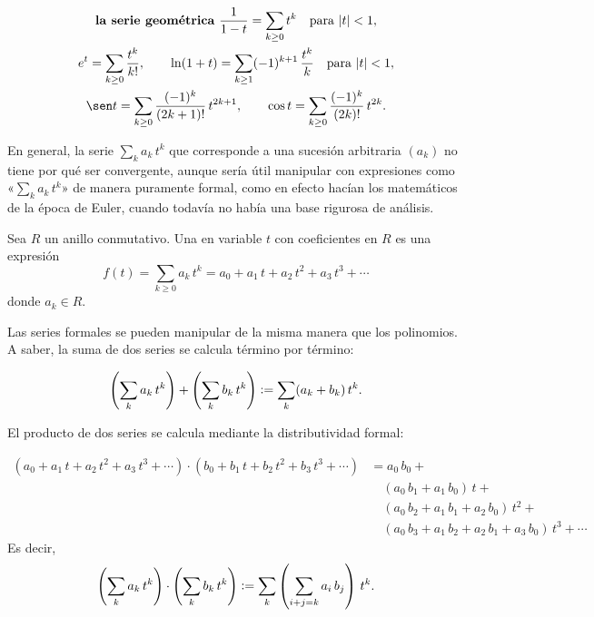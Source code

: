 \documentclass{article}
\numberwithin{equation}{section}
\theoremstyle{definition}
\begin{document}
\begin{gather*}
  \text{\term{la serie geométrica} }\frac{1}{1-t} = \sum_{k \ge 0} t^k\quad\text{para }|t| < 1,\\
  e^t = \sum_{k\ge 0} \frac{t^k}{k!}, \quad\quad
  \ln (1+t) = \sum_{k \ge 1} (-1)^{k+1}\,\frac{t^k}{k}\quad\text{para }|t| < 1,\\
  \sen t = \sum_{k \ge 0} \frac{(-1)^k}{(2k+1)!}\,t^{2k+1}, \quad\quad
  \cos t = \sum_{k \ge 0} \frac{(-1)^k}{(2k)!}\,t^{2k}.
\end{gather*}

En general, la serie $\sum_k a_k\,t^k$ que corresponde a una sucesión arbitraria
$(a_k)$ no tiene por qué ser convergente, aunque sería útil manipular con
expresiones como «$\sum_k a_k\,t^k$» de manera puramente formal, como en
efecto hacían los matemáticos de la época de Euler, cuando todavía no había
una base rigurosa de análisis.

\begin{definicion}
  Sea $R$ un anillo conmutativo. Una  en
  variable $t$ con coeficientes en $R$ es una expresión
  $$f (t) = \sum_{k \ge 0} a_k\,t^k = a_0 + a_1\,t + a_2\,t^2 + a_3\,t^3 + \cdots$$
  donde $a_k \in R$.
\end{definicion}

Las series formales se pueden manipular de la misma manera que los polinomios.
A saber, la suma de dos series se calcula término por término:

\begin{equation}
  \label{adicion-de-series-formales}
  \left(\sum_k a_k\,t^k\right) + \left(\sum_k b_k\,t^k\right) \mathrel{\mathop:}= \sum_k (a_k+b_k)\,t^k.
\end{equation}

El producto de dos series se calcula mediante la distributividad formal:

\begin{align*}
  (a_0 + a_1\,t + a_2\,t^2 + a_3\,t^3 + \cdots)\cdot
  (b_0 + b_1\,t + b_2\,t^2 + b_3\,t^3 + \cdots) & = a_0\,b_0 + ~\\
                                                & \quad (a_0\,b_1 + a_1\,b_0)\,t + ~ \\
                                                & \quad (a_0\,b_2 + a_1\,b_1 + a_2\,b_0)\,t^2 + ~ \\
                                                & \quad (a_0\,b_3 + a_1\,b_2 + a_2\,b_1 + a_3\,b_0)\,t^3 + \cdots
\end{align*}
Es decir,
\begin{equation}
  \label{multiplicacion-de-series-formales}
  \left(\sum_k a_k\,t^k\right) \cdot \left(\sum_k b_k\,t^k\right) \mathrel{\mathop:}=
  \sum_k \left(\sum_{i+j=k} a_i\,b_j\right)\,t^k.
\end{equation}
\end{document}
